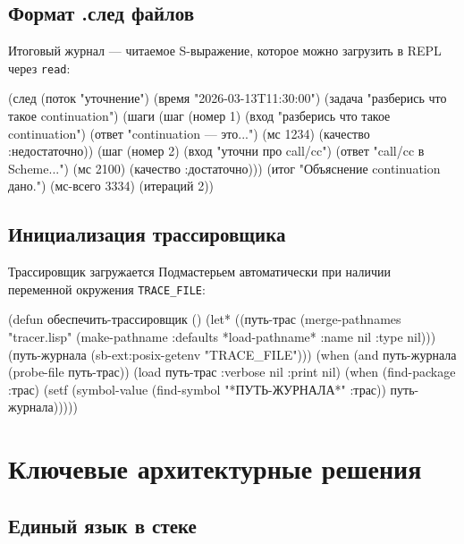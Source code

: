 \documentclass[11pt,a4paper]{article}
\begin{document}
\subsection{Формат .след файлов}

Итоговый журнал — читаемое S-выражение, которое можно загрузить в REPL через \texttt{read}:

\begin{lispcode}[caption={Пример .след файла}]
(след
  (поток "уточнение") (время "2026-03-13T11:30:00")
  (задача "разберись что такое continuation")
  (шаги
    (шаг (номер 1) (вход "разберись что такое continuation")
         (ответ "continuation — это...") (мс 1234)
         (качество :недостаточно))
    (шаг (номер 2) (вход "уточни про call/cc")
         (ответ "call/cc в Scheme...") (мс 2100)
         (качество :достаточно)))
  (итог "Объяснение continuation дано.") (мс-всего 3334)
  (итераций 2))
\end{lispcode}

\subsection{Инициализация трассировщика}

Трассировщик загружается Подмастерьем автоматически при наличии переменной окружения \texttt{TRACE\_FILE}:

\begin{lispcode}[caption={подмастерье/исполнитель.lisp — ленивая загрузка трассировщика}]
(defun обеспечить-трассировщик ()
  (let* ((путь-трас
          (merge-pathnames "tracer.lisp"
            (make-pathname
              :defaults *load-pathname*
              :name nil :type nil)))
         (путь-журнала (sb-ext:posix-getenv "TRACE_FILE")))
    (when (and путь-журнала (probe-file путь-трас))
      (load путь-трас :verbose nil :print nil)
      (when (find-package :трас)
        (setf (symbol-value
                (find-symbol "*ПУТЬ-ЖУРНАЛА*" :трас))
              путь-журнала)))))
\end{lispcode}

\section{Ключевые архитектурные решения}
\label{sec:design}

\subsection{Единый язык в стеке}
\end{document}
